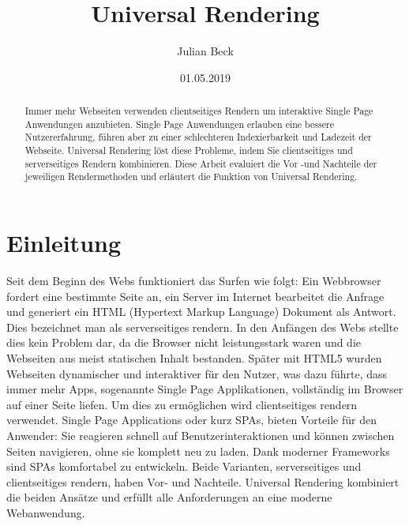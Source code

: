 \documentclass[runningheads]{llncs}
\title{Universal Rendering}
\author{Julian Beck}
\institute{Betreuer: Prof. Dr. rer. nat. Christian Zirpins}
\date{01.05.2019}
\numberwithin{figure}{section}
\begin{document}
\let\oldaddcontentsline\addcontentsline
\def\addcontentsline#1#2#3{}
\maketitle
\def\addcontentsline#1#2#3{\oldaddcontentsline{#1}{#2}{#3}}



\begin{abstract}
  Immer mehr Webseiten verwenden clientseitiges Rendern um interaktive Single Page Anwendungen 
  anzubieten. Single Page Anwendungen erlauben eine bessere Nutzererfahrung,
  führen aber zu einer schlechteren Indexierbarkeit und Ladezeit der Webseite. Universal Rendering
  löst diese Probleme, indem Sie clientseitiges und serverseitiges Rendern kombinieren. Diese Arbeit 
  evaluiert die Vor -und Nachteile der jeweiligen Rendermethoden und erläutert die Funktion von Universal 
  Rendering.
\end{abstract}

\tableofcontents 
\newpage

\section{Einleitung}
\label{sec:Einleitung}
Seit dem Beginn des Webs funktioniert das Surfen wie folgt: 
Ein Webbrowser fordert eine bestimmte Seite an, ein Server im 
Internet bearbeitet die Anfrage und generiert ein HTML 
(Hypertext Markup Language) Dokument als Antwort. 
Dies bezeichnet man als serverseitiges rendern. 
In den Anfängen des Webs stellte dies kein Problem dar, 
da die Browser nicht leistungsstark waren und die Webseiten 
aus meist statischen Inhalt bestanden. 
Später mit HTML5 wurden Webseiten dynamischer und 
interaktiver für den Nutzer, was dazu führte, dass immer mehr Apps, 
sogenannte Single Page Applikationen, 
vollständig im Browser auf einer Seite liefen. 
Um dies zu ermöglichen wird clientseitiges rendern verwendet. 
Single Page Applications oder kurz SPAs, bieten Vorteile für den Anwender: 
Sie reagieren schnell auf Benutzerinteraktionen und können zwischen Seiten navigieren, 
ohne sie komplett neu zu laden. Dank moderner Frameworks sind SPAs komfortabel zu entwickeln.
Beide Varianten, serverseitiges und clientseitiges rendern, 
haben Vor- und Nachteile. Universal Rendering kombiniert die beiden Ansätze und 
erfüllt alle Anforderungen an eine moderne Webanwendung.
\end{document}
